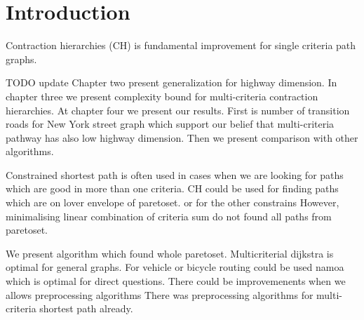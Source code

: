 % 
%  
%  
%  

\section{Introduction}
\label{secIntroduction}

Contraction hierarchies (CH) \cite{geisberger2008contraction}
is fundamental improvement for single criteria path graphs.

TODO update 
Chapter two present generalization for highway dimension. In chapter
three we present complexity bound for multi-criteria contraction hierarchies.
At chapter four we present our results. First is number of transition roads for
New York street graph which support our belief that multi-criteria pathway
has also low highway dimension.
Then we present comparison with other algorithms.



Constrained shortest path 
\cite{pugliese2013survey} is often used in cases when we are looking for
paths which are good in more than one criteria.
CH could be used for finding 
paths which are on lover envelope of paretoset.
\cite{funke2013polynomial}
or for the other constrains 
However, minimalising linear combination of criteria sum 
do not found all paths from paretoset.

We present algorithm which found whole paretoset.
Multicriterial dijkstra is optimal for general graphs.
For vehicle or bicycle routing could be used namoa
which is optimal for direct questions.
There could be improvemenents when we allows preprocessing
algorithms 
There was preprocessing algorithms for multi-criteria
shortest path already.
\cite{kohler2005acceleration} 

